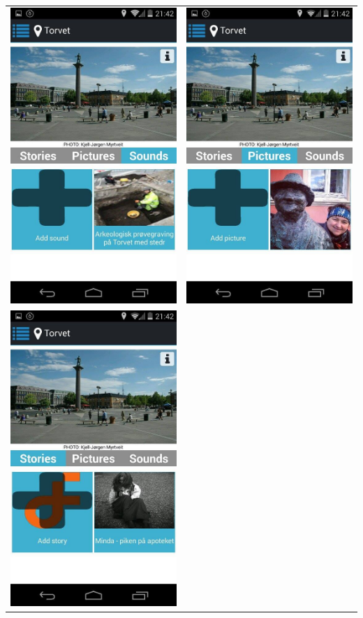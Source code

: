 \documentclass[12pt,a4paper,titlepage]{article}
\begin{document}
\begin{appendices}
\begin{center}
\begin{tabular}{cc}
	 	\includegraphics[width=0.35 \textwidth]{res/ScreenShot5.jpg}	& 	
	 	\includegraphics[width=0.35 \textwidth]{res/ScreenShot6.jpg}\\
	 	\includegraphics[width=0.35 \textwidth]{res/ScreenShot7.jpg}	&

\end{tabular}
\end{center}
\end{appendices}
\end{document}
